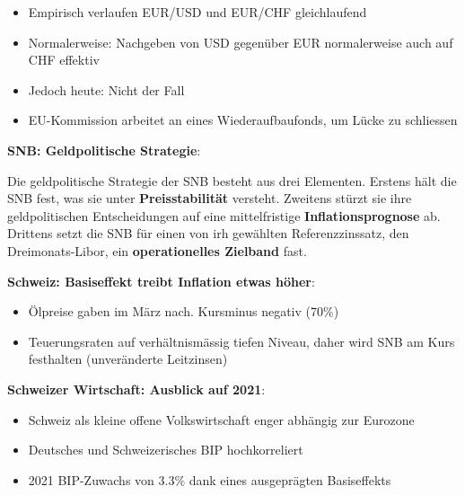 \documentclass[9pt, landscape, fleqn]{scrartcl}
\begin{document}
\begin{multicols*}{3}
\begin{itemize}
    \item Empirisch verlaufen EUR/USD und EUR/CHF gleichlaufend
    \item Normalerweise: Nachgeben von USD gegenüber EUR normalerweise auch auf CHF effektiv
    \item Jedoch heute: Nicht der Fall 
    \item EU-Kommission arbeitet an eines Wiederaufbaufonds, um Lücke zu schliessen 
\end{itemize}

\textbf{SNB: Geldpolitische Strategie}:

Die geldpolitische Strategie der SNB besteht aus drei Elementen. Erstens hält die SNB fest, was sie unter \textbf{Preisstabilität} versteht. Zweitens stürzt sie ihre geldpolitischen 
Entscheidungen auf eine mittelfristige \textbf{Inflationsprognose} ab. Drittens setzt die SNB für einen von irh gewählten Referenzzinssatz, den Dreimonats-Libor, ein \textbf{operationelles Zielband} fast. \newline \newline

\textbf{Schweiz: Basiseffekt treibt Inflation etwas höher}:

\begin{itemize}
    \item Ölpreise gaben im März nach. Kursminus negativ (70\%)
    \item Teuerungsraten auf verhältnismässig tiefen Niveau, daher wird SNB am Kurs festhalten (unveränderte Leitzinsen)
\end{itemize}

\textbf{Schweizer Wirtschaft: Ausblick auf 2021}:

\begin{itemize}
    \item Schweiz als kleine offene Volkswirtschaft enger abhängig zur Eurozone 
    \item Deutsches und Schweizerisches BIP hochkorreliert 
    \item 2021 BIP-Zuwachs von 3.3\% dank eines ausgeprägten Basiseffekts 
\end{itemize}


\end{multicols*}
\end{document}
